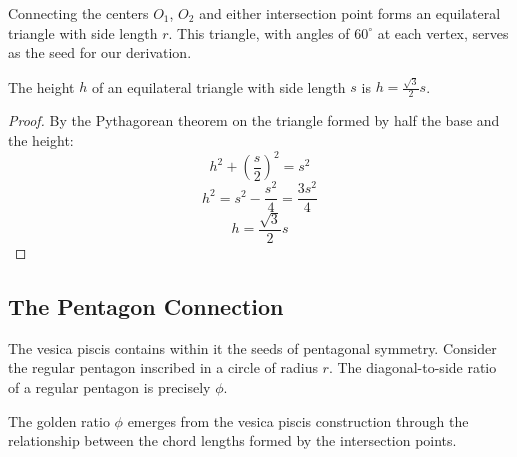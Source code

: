 Connecting the centers $O_1$, $O_2$ and either intersection point forms an equilateral triangle with side length $r$. This triangle, with angles of $60^\circ$ at each vertex, serves as the seed for our derivation.

\begin{lemma}
The height $h$ of an equilateral triangle with side length $s$ is $h = \frac{\sqrt{3}}{2}s$.
\end{lemma}

\begin{proof}
By the Pythagorean theorem on the triangle formed by half the base and the height:
\[
h^2 + \left(\frac{s}{2}\right)^2 = s^2
\]
\[
h^2 = s^2 - \frac{s^2}{4} = \frac{3s^2}{4}
\]
\[
h = \frac{\sqrt{3}}{2}s
\]
\end{proof}

\subsection{The Pentagon Connection}

The vesica piscis contains within it the seeds of pentagonal symmetry. Consider the regular pentagon inscribed in a circle of radius $r$. The diagonal-to-side ratio of a regular pentagon is precisely $\phi$.

\begin{theorem}
The golden ratio $\phi$ emerges from the vesica piscis construction through the relationship between the chord lengths formed by the intersection points.
\end{theorem}

